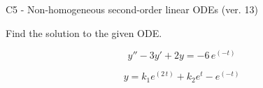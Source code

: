 \begin{exercise}
  \begin{exerciseTitle}C5 - Non-homogeneous second-order linear ODEs (ver. 13)\end{exerciseTitle}
  \begin{exerciseStatement}
    
Find the solution to the given ODE.

    
\[y''-3y'+2y = -6 \, e^{\left(-t\right)}\]

  \end{exerciseStatement}
  \begin{exerciseAnswer}
    
\[y= k_{1} e^{\left(2 \, t\right)} + k_{2} e^{t} - e^{\left(-t\right)}\]

  \end{exerciseAnswer}
\end{exercise}